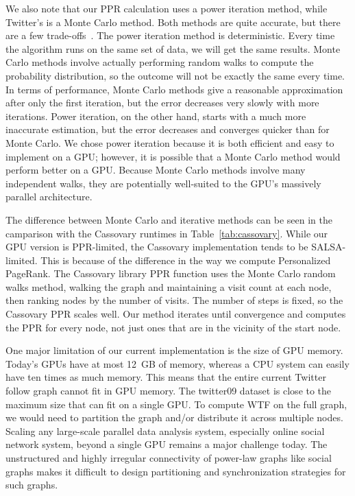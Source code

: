 \documentclass{article}
\renewcommand{\cite}[1]{}
\begin{document}
We also note that our PPR calculation uses a power iteration method, while
Twitter's is a Monte Carlo method. Both methods are quite accurate, but
there are a few trade-offs~\cite{Avrachenkov:2007:MCM}. The power iteration
method is deterministic. Every time the algorithm runs on the same set of
data, we will get the same results. Monte Carlo methods involve actually
performing random walks to compute the probability distribution, so the
outcome will not be exactly the same every time. In terms of performance,
Monte Carlo methods give a reasonable approximation after only the first
iteration, but the error decreases very slowly with more iterations. Power
iteration, on the other hand, starts with a much more inaccurate
estimation, but the error decreases and converges quicker than for Monte
Carlo. We chose power iteration because it is both efficient and easy to
implement on a GPU; however, it is possible that a Monte Carlo method would
perform better on a GPU\@. Because Monte Carlo methods involve many
independent walks, they are potentially well-suited to the GPU's massively
parallel architecture.

The difference between Monte Carlo and iterative methods can be seen in the
camparison with the Cassovary runtimes in Table~\ref{tab:cassovary}. While
our GPU version is PPR-limited, the Cassovary implementation tends to be
SALSA-limited. This is because of the difference in the way we compute
Personalized PageRank. The Cassovary library PPR function uses the Monte
Carlo random walks method, walking the graph and maintaining a visit count
at each node, then ranking nodes by the number of visits. The number of
steps is fixed, so the Cassovary PPR scales well. Our method iterates until
convergence and computes the PPR for every node, not just ones that are in
the vicinity of the start node.

One major limitation of our current implementation is the size of GPU
memory. Today's GPUs have at most 12~GB of memory, whereas a CPU system can
easily have ten times as much memory. This means that the entire current
Twitter follow graph cannot fit in GPU memory. The twitter09 dataset is
close to the maximum size that can fit on a single GPU\@. To compute WTF on
the full graph, we would need to partition the graph and/or distribute it
across multiple nodes. Scaling any large-scale parallel data analysis
system, especially online social network system, beyond a single GPU
remains a major challenge today. The unstructured and highly irregular
connectivity of power-law graphs like social graphs makes it difficult to
design partitioning and synchronization strategies for such graphs.
\end{document}
